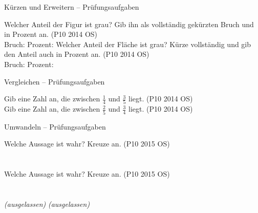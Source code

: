 \begin{aufgabe}{Kürzen und Erweitern – Prüfungsaufgaben}
\begin{teile}
\teil Welcher Anteil der Figur ist grau? Gib ihn als vollständig gekürzten Bruch und in Prozent an. \hfill (P10 2014 OS) \\

Bruch: \leerfeld Prozent: \leerfeld[\%]
\teil Welcher Anteil der Fläche ist grau? Kürze vollständig und gib den Anteil auch in Prozent an. \hfill (P10 2014 OS) \\

Bruch: \leerfeld Prozent: \leerfeld[\%]
\end{teile}
\end{aufgabe}

\begin{aufgabe}{Vergleichen – Prüfungsaufgaben}
\begin{teile}
\teil Gib eine Zahl an, die zwischen $\frac{1}{4}$ und $\frac{3}{5}$ liegt. \hfill (P10 2014 OS) \\ \leerfeld
\teil Gib eine Zahl an, die zwischen $\frac{2}{5}$ und $\frac{3}{4}$ liegt. \hfill (P10 2014 OS) \\ \leerfeld
\end{teile}
\end{aufgabe}

\begin{aufgabe}{Umwandeln – Prüfungsaufgaben}
\begin{teile}
\teil Welche Aussage ist wahr? Kreuze an. \hfill (P10 2015 OS)\\ \\ \\ 
\teil Welche Aussage ist wahr? Kreuze an. \hfill (P10 2015 OS)\\ \\ \\ 
\teil \textit{(ausgelassen)}
\teil \textit{(ausgelassen)}
\end{teile}
\end{aufgabe}

